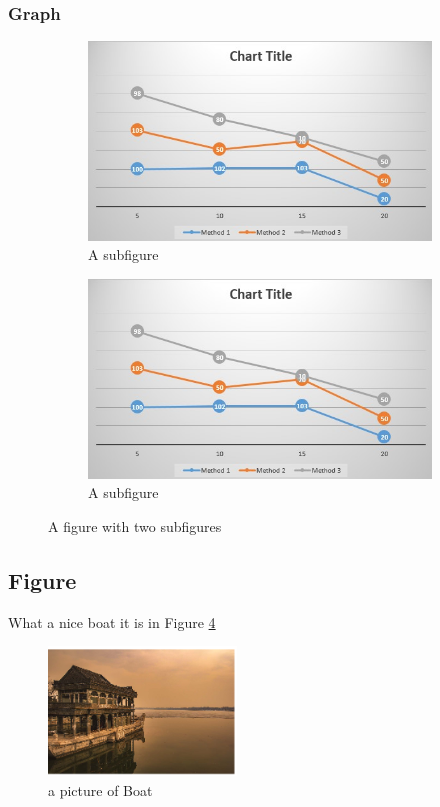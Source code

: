 \documentclass[preprint,11pt]{elsarticle}
\begin{document}
	\subsubsection{Graph}
	\begin{figure}[h!]
		\centering
		\begin{subfigure}{.5\textwidth}
			\includegraphics[width=.9\linewidth]{graph1.jpg}
			\caption{A subfigure}
			\label{fig:sub1}
		\end{subfigure}%
		\begin{subfigure}{.5\textwidth}
			\includegraphics[width=.9\textwidth]{graph1.jpg}
			\caption{A subfigure}
			\label{fig:sub2}
		\end{subfigure}
		\caption{A figure with two subfigures}
		\label{fig:test}
	\end{figure}
	\subsection{Figure}
	What a nice boat it is in Figure \ref{fig:boat}
	\begin{figure}[h]
		\centering
		\includegraphics[width=5cm]{boat.jpg}
		\caption{a picture of Boat }
		\label{fig:boat}
	\end{figure}
\end{document}
